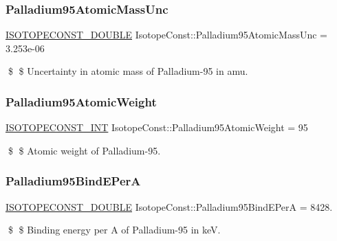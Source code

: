 \subsubsection{\texorpdfstring{Palladium95\+Atomic\+Mass\+Unc}{Palladium95AtomicMassUnc}}
{\footnotesize\ttfamily \mbox{\hyperlink{group___isotope_const-_macros_ga8f45a7272ce02c0b4c65c44636ed719a}{I\+S\+O\+T\+O\+P\+E\+C\+O\+N\+S\+T\+\_\+\+D\+O\+U\+B\+LE}} Isotope\+Const\+::\+Palladium95\+Atomic\+Mass\+Unc = 3.\+253e-\/06}

\$ \$ Uncertainty in atomic mass of Palladium-\/95 in amu. \mbox{\label{group___isotope_const-_palladium-_pd95_ga178a9e3e446c5b56f8379dc8bcae5c0b}} 
\subsubsection{\texorpdfstring{Palladium95\+Atomic\+Weight}{Palladium95AtomicWeight}}
{\footnotesize\ttfamily \mbox{\hyperlink{group___isotope_const-_macros_ga5f18360b3e99483a35c32d789e62621c}{I\+S\+O\+T\+O\+P\+E\+C\+O\+N\+S\+T\+\_\+\+I\+NT}} Isotope\+Const\+::\+Palladium95\+Atomic\+Weight = 95}

\$ \$ Atomic weight of Palladium-\/95. \mbox{\label{group___isotope_const-_palladium-_pd95_ga33eb0499393939029730f9f0ec4ad3a8}} 
\subsubsection{\texorpdfstring{Palladium95\+Bind\+E\+PerA}{Palladium95BindEPerA}}
{\footnotesize\ttfamily \mbox{\hyperlink{group___isotope_const-_macros_ga8f45a7272ce02c0b4c65c44636ed719a}{I\+S\+O\+T\+O\+P\+E\+C\+O\+N\+S\+T\+\_\+\+D\+O\+U\+B\+LE}} Isotope\+Const\+::\+Palladium95\+Bind\+E\+PerA = 8428.}

\$ \$ Binding energy per A of Palladium-\/95 in keV. \mbox{\label{group___isotope_const-_palladium-_pd95_gaaf3476574e510472ba6289a5806b381f}} 

